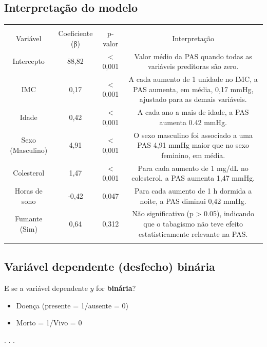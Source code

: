 \documentclass[
  letterpaper,
  DIV=11,
  numbers=noendperiod]{scrartcl}
\providecommand{\tightlist}{%
  \setlength{\itemsep}{0pt}\setlength{\parskip}{0pt}}\usepackage{longtable,booktabs,array}
\begin{document}
\subsection{Interpretação do
modelo}\label{interpretauxe7uxe3o-do-modelo}

\begin{longtable}[]{@{}cccc@{}}
\toprule\noalign{}
& & & \\
Variável & Coeficiente (β) & p-valor & Interpretação \\
\midrule\noalign{}
\endhead
\bottomrule\noalign{}
\endlastfoot
Intercepto & 88,82 & \textless{} 0,001 & Valor médio da PAS quando todas
as variáveis preditoras são zero. \\
IMC & 0,17 & \textless{} 0,001 & A cada aumento de 1 unidade no IMC, a
PAS aumenta, em média, 0,17 mmHg, ajustado para as demais variáveis. \\
Idade & 0,42 & \textless{} 0,001 & A cada ano a mais de idade, a PAS
aumenta 0.42 mmHg. \\
Sexo (Masculino) & 4,91 & \textless{} 0,001 & O sexo masculino foi
associado a uma PAS 4,91 mmHg maior que no sexo feminino, em média. \\
Colesterol & 1,47 & \textless{} 0,001 & Para cada aumento de 1 mg/dL no
colesterol, a PAS aumenta 1,47 mmHg. \\
Horas de sono & -0,42 & 0,047 & Para cada aumento de 1 h dormida a
noite, a PAS diminui 0,42 mmHg. \\
Fumante (Sim) & 0,64 & 0,312 & Não significativo (p \textgreater{}
0.05), indicando que o tabagismo não teve efeito estatisticamente
relevante na PAS. \\
& & & \\
\end{longtable}

\subsection{Variável dependente (desfecho)
binária}\label{variuxe1vel-dependente-desfecho-binuxe1ria}

E se a variável dependente \(y\) for \textbf{binária}?

\begin{itemize}
\tightlist
\item
  Doença (presente = 1/ausente = 0)
\item
  Morto = 1/Vivo = 0
\end{itemize}

. . .
\end{document}
